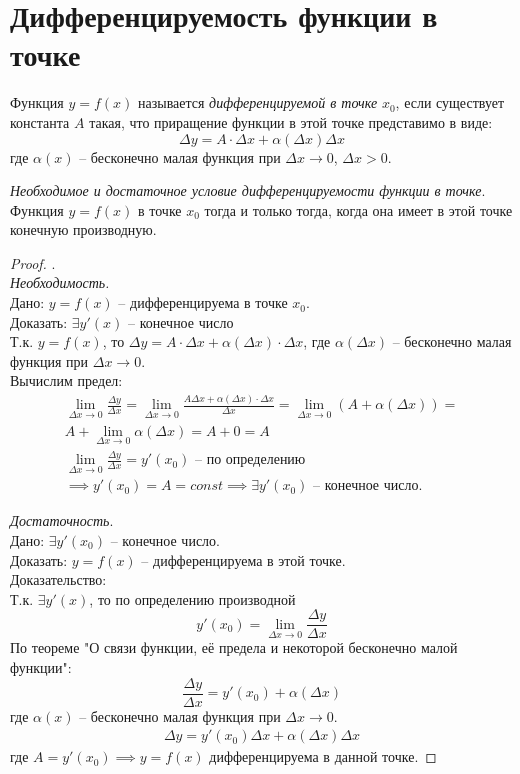 \section{Дифференцируемость функции в точке}

\begin{definition}
  Функция $y= f(x)$ называется \textit{дифференцируемой в точке} $x_0$, если существует константа $A$ такая, что приращение функции в этой точке представимо в виде: \[
  \Delta y = A \cdot \Delta x + \alpha(\Delta x) \Delta x
  \]
  где $\alpha(x)$ -- бесконечно малая функция при $\Delta x \to 0$, $\Delta x > 0$.
\end{definition}

\begin{theorem}
  \textit{Необходимое и достаточное условие дифференцируемости функции в точке}.\\ 
  Функция $y = f(x)$ в точке  $x_0$ тогда и только тогда, когда она имеет в этой точке конечную производную.
\end{theorem}
\begin{proof}.\\
  \textit{Необходимость.} \\
  Дано: $y = f(x)$ -- дифференцируема в точке  $x_0$. \\
  Доказать: $\exists  y'(x)$ -- конечное число \\
  Т.к. $y = f(x)$, то  $\Delta y = A \cdot \Delta x + \alpha(\Delta x) \cdot \Delta x$, где $\alpha(\Delta x)$ -- бесконечно малая функция при $\Delta x \to 0$. \\
  Вычислим предел: 
  \begin{gather*}
    \lim_{\Delta x \to 0} \frac{\Delta y}{\Delta x} = \lim_{\Delta x \to 0} \frac{A \Delta x + \alpha(\Delta x) \cdot \Delta x}{\Delta x} = \lim_{\Delta x \to 0} \left( A + \alpha(\Delta x) \right)  = \\
    A + \lim_{\Delta x \to 0} \alpha(\Delta x) = A + 0 = A \\
    \lim_{\Delta x \to 0} \frac{\Delta y}{\Delta x} = y'(x_0) \text{ -- по определению} \\
    \implies y'(x_0) = A = const \implies \exists  y'(x_0) \text{ -- конечное число}.
  \end{gather*}

  \textit{Достаточность}. \\
  Дано: $\exists y'(x_0)$ -- конечное число. \\
  Доказать: $y = f(x)$ -- дифференцируема в этой точке. \\
  Доказательство: \\
  Т.к. $\exists y'(x)$, то по определению производной  \[
    y'(x_{0}) = \lim_{\Delta x \to 0} \frac{\Delta y}{\Delta x}
  \]
  По теореме "О связи функции, её предела и некоторой бесконечно малой функции": \[
  \frac{\Delta y}{\Delta x} = y'(x_0) + \alpha(\Delta x)
  \] 
  где $\alpha(x)$ -- бесконечно малая функция при $\Delta x \to 0$.
  \begin{gather*}
    \Delta y = y'(x_0) \Delta x + \alpha(\Delta x) \Delta x
  \end{gather*}
  где $A = y'(x_0) \implies y = f(x)$ дифференцируема в данной точке.
\end{proof}

